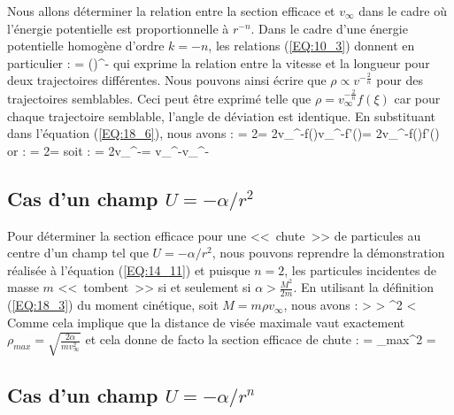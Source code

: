 Nous allons d\'eterminer la relation entre la section efficace et $v_{\infty}$ dans le cadre o\`u l'\'energie potentielle est proportionnelle \`a $r^{-n}$. Dans le cadre d'une \'energie potentielle homog\`ene d'ordre $k = -n$, les relations (\ref{EQ:10_3}) donnent en particulier :
\benn
	 = \left(\right)^{-}
\eenn
qui exprime la relation entre la vitesse et la longueur pour deux trajectoires diff\'erentes. Nous pouvons ainsi \'ecrire que $\rho\propto v^{-\frac{2}{n}}$ pour des trajectoires semblables. Ceci peut \^etre exprim\'{e} telle que $\rho = v_{\infty}^{-\frac{2}{n}}f(\xi)$ car pour chaque trajectoire semblable, l'angle de d\'eviation est identique. En substituant dans l'\'equation (\ref{EQ:18_6}), nous avons :
\benn
	\sigma = 2\pi\rho{}\rho = 2\pi v_{\infty}^{-}f(\xi)\cdot v_{\infty}^{-}f'(\xi)\xi = 2\pi v_{\infty}^{-}f(\xi)f'(\xi)\xi
\eenn
or :
\benn
	\omega = 2\pi\sin\xi{}\xi \Rightarrow {}\xi = 
\eenn
soit :
\benn
	\sigma = 2\pi v_{\infty}^{-}\omega = v_{\infty}^{-}\omega \propto v_{\infty}^{-}\omega
\eenn

\subsection{Cas d'un champ $U = -\alpha / r^{2}$}

Pour d\'eterminer la section efficace pour une <<~chute~>> de particules au centre d'un champ tel que $U = -\alpha / r^{2}$, nous pouvons reprendre la d\'emonstration r\'ealis\'ee à l'\'equation (\ref{EQ:14_11}) et puisque $n = 2$, les particules incidentes de masse $m$ <<~tombent~>> si et seulement si $\alpha > \frac{M^{2}}{2m}$. En utilisant la d\'efinition (\ref{EQ:18_3}) du moment cin\'etique, soit $M = m\rho v_{\infty}$, nous avons :
\benn
	\alpha >  \Leftrightarrow \alpha >  \Leftrightarrow \rho^{2} < 
\eenn
Comme cela implique que la distance de vis\'ee maximale vaut exactement $\rho_{max} = \sqrt{\frac{2\alpha}{mv_{\infty}^{2}}}$ et cela donne de facto la section efficace de chute :
\benn
	\sigma = \pi\rho_{max}^{2} = 
\eenn

\subsection{Cas d'un champ $U = -\alpha / r^{n}$}

